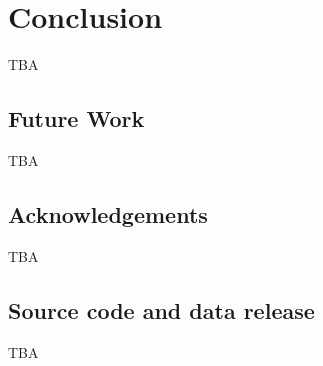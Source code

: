 \documentclass[runningheads,a4paper]{llncs}
\begin{document}
\section{Conclusion} TBA
\subsection{Future Work} TBA
\subsection{Acknowledgements} TBA
\subsection{Source code and data release} TBA
\end{document}
